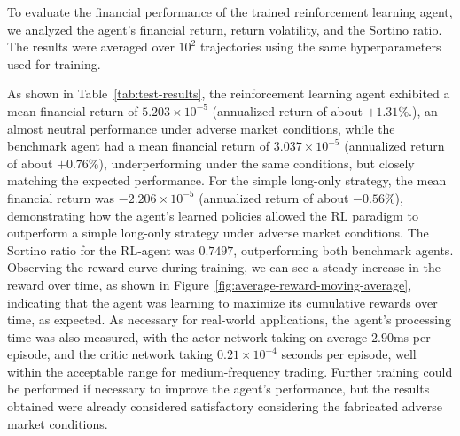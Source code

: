 To evaluate the financial performance of the trained reinforcement learning agent, we analyzed the agent's
financial return, return volatility, and the Sortino ratio.
The results were averaged over $10^2$ trajectories using the same hyperparameters used for training.

As shown in Table~\ref{tab:test-results}, the reinforcement learning agent exhibited a mean financial return of $5.203 \times 10^{-5}$
(annualized return of about $+1.31\%$.), an almost neutral performance under adverse market conditions,
while the benchmark agent had a mean financial return of $3.037 \times 10^{-5}$ (annualized return of about $+0.76\%$),
underperforming under the same conditions, but closely matching the expected performance.
For the simple long-only strategy, the mean financial return was $-2.206 \times 10^{-5}$ (annualized return of about $-0.56\%$),
demonstrating how the agent's learned policies allowed the RL paradigm to outperform a simple long-only strategy under adverse market conditions.
The Sortino ratio for the RL-agent was $0.7497$, outperforming both benchmark agents.
Observing the reward curve during training, we can see a steady increase in the reward over time, as shown in Figure~\ref{fig:average-reward-moving-average},
indicating that the agent was learning to maximize its cumulative rewards over time, as expected.
As necessary for real-world applications, the agent's processing time was also measured, with the actor network taking on average $2.90$ms per episode,
and the critic network taking $0.21 \times 10^{-4}$ seconds per episode, well within the acceptable range for medium-frequency trading.
Further training could be performed if necessary to improve the agent's performance, but the results obtained were already considered satisfactory
considering the fabricated adverse market conditions.

